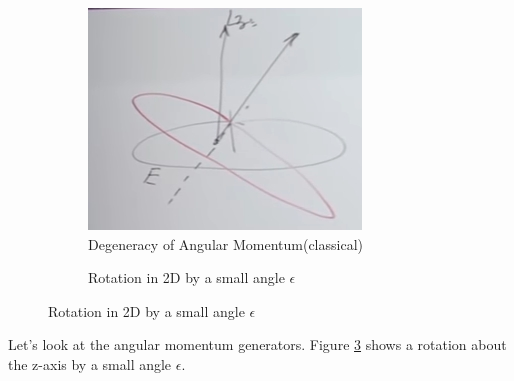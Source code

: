 \documentclass[]{article}
\begin{document}
\begin{figure}[H]
	\caption{An example: Angular Momentum}
	\begin{subfigure}[t]{0.45\textwidth}
		\caption{Degeneracy of Angular Momentum(classical)}\label{eq:aqm-2-1}
		\includegraphics[width=\textwidth]{aqm-2-1}
	\end{subfigure}
	\hfill
	\begin{subfigure}[t]{0.45\textwidth}
		\caption{Rotation in 2D by a small angle $\epsilon$}\label{fig:aqm-2-2}
	\end{subfigure}
\end{figure}

Let's look at the angular momentum generators. Figure \ref{fig:aqm-2-2} shows a  rotation about the z-axis by a small angle $\epsilon$.
\end{document}
